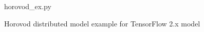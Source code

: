 



\begin{figure}[ht!]
 
{horovod_ex.py}
  \caption{Horovod distributed model example for TensorFlow 2.x model}
\label{fig:back:hvd2} 
\end{figure}

